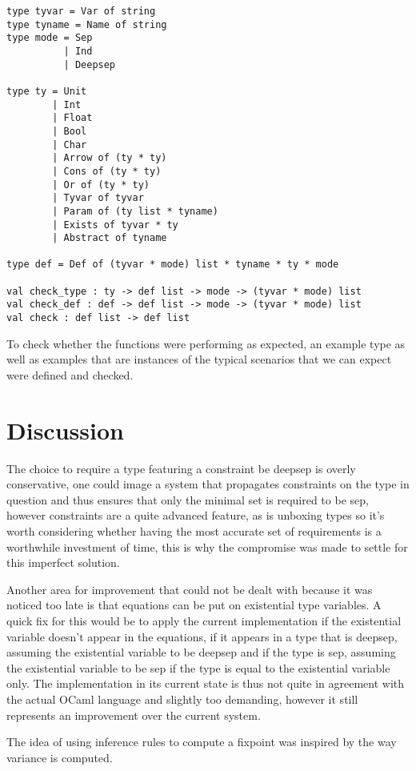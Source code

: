 \documentclass[a4]{article}
\begin{document}
\begin{lstlisting}
type tyvar = Var of string
type tyname = Name of string
type mode = Sep
          | Ind
          | Deepsep

type ty = Unit
        | Int
        | Float
        | Bool
        | Char
        | Arrow of (ty * ty)
        | Cons of (ty * ty)
        | Or of (ty * ty)
        | Tyvar of tyvar
        | Param of (ty list * tyname)
        | Exists of tyvar * ty
        | Abstract of tyname

type def = Def of (tyvar * mode) list * tyname * ty * mode

val check_type : ty -> def list -> mode -> (tyvar * mode) list
val check_def : def -> def list -> mode -> (tyvar * mode) list
val check : def list -> def list
\end{lstlisting}

To check whether the functions were performing as expected, an example type as well as examples that are instances of the typical scenarios that we can expect were defined and checked.

\section{Discussion}

The choice to require a type featuring a constraint be deepsep is overly conservative, one could image a system that propagates constraints on the type in question and thus ensures that only the minimal set is required to be sep, however constraints are a quite advanced feature, as is unboxing types so it's worth considering whether having the most accurate set of requirements is a worthwhile investment of time, this is why the compromise was made to settle for this imperfect solution.

Another area for improvement that could not be dealt with because it was noticed too late is that equations can be put on existential type variables. A quick fix for this would be to apply the current implementation if the existential variable doesn't appear in the equations, if it appears in a type that is deepsep, assuming the existential variable to be deepsep and if the type is sep, assuming the existential variable to be sep if the type is equal to the existential variable only. The implementation in its current state is thus not quite in agreement with the actual OCaml language and slightly too demanding, however it still represents an improvement over the current system.

The idea of using inference rules to compute a fixpoint was inspired by the way variance is computed. 
\end{document}
